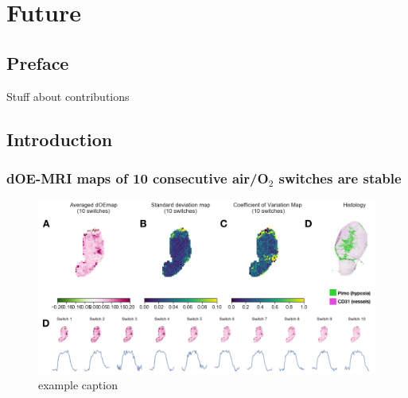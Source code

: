 
\chapter{Future}
\label{ch:future}

\section{Preface}

Stuff about contributions 

\section{Introduction}

\subsection{dOE-MRI maps of 10 consecutive air/O$_2$ switches are stable}

\begin{figure}[htbp]
   \centering
   \includegraphics[width=\textwidth]{images/6_longcycles.png} %
   \caption{example caption}
   \label{longcycles}
\end{figure}

